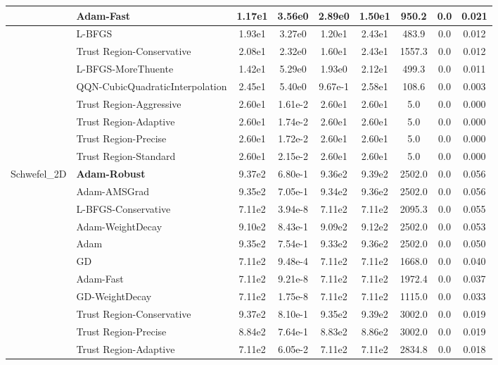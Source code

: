 \documentclass{article}
\begin{document}
\begin{longtable}{|l|l|c|c|c|c|c|c|c|}
\hline
 & Adam-Fast & 1.17e1 & 3.56e0 & 2.89e0 & 1.50e1 & 950.2 & 0.0 & 0.021 \\
\hline
 & L-BFGS & 1.93e1 & 3.27e0 & 1.20e1 & 2.43e1 & 483.9 & 0.0 & 0.012 \\
\hline
 & Trust Region-Conservative & 2.08e1 & 2.32e0 & 1.60e1 & 2.43e1 & 1557.3 & 0.0 & 0.012 \\
\hline
 & L-BFGS-MoreThuente & 1.42e1 & 5.29e0 & 1.93e0 & 2.12e1 & 499.3 & 0.0 & 0.011 \\
\hline
 & QQN-CubicQuadraticInterpolation & 2.45e1 & 5.40e0 & 9.67e-1 & 2.58e1 & 108.6 & 0.0 & 0.003 \\
\hline
 & Trust Region-Aggressive & 2.60e1 & 1.61e-2 & 2.60e1 & 2.60e1 & 5.0 & 0.0 & 0.000 \\
\hline
 & Trust Region-Adaptive & 2.60e1 & 1.74e-2 & 2.60e1 & 2.60e1 & 5.0 & 0.0 & 0.000 \\
\hline
 & Trust Region-Precise & 2.60e1 & 1.72e-2 & 2.60e1 & 2.60e1 & 5.0 & 0.0 & 0.000 \\
\hline
 & Trust Region-Standard & 2.60e1 & 2.15e-2 & 2.60e1 & 2.60e1 & 5.0 & 0.0 & 0.000 \\
Schwefel\_2D & \textbf{Adam-Robust} & 9.37e2 & 6.80e-1 & 9.36e2 & 9.39e2 & 2502.0 & 0.0 & 0.056 \\
\hline
 & Adam-AMSGrad & 9.35e2 & 7.05e-1 & 9.34e2 & 9.36e2 & 2502.0 & 0.0 & 0.056 \\
\hline
 & L-BFGS-Conservative & 7.11e2 & 3.94e-8 & 7.11e2 & 7.11e2 & 2095.3 & 0.0 & 0.055 \\
\hline
 & Adam-WeightDecay & 9.10e2 & 8.43e-1 & 9.09e2 & 9.12e2 & 2502.0 & 0.0 & 0.053 \\
\hline
 & Adam & 9.35e2 & 7.54e-1 & 9.33e2 & 9.36e2 & 2502.0 & 0.0 & 0.050 \\
\hline
 & GD & 7.11e2 & 9.48e-4 & 7.11e2 & 7.11e2 & 1668.0 & 0.0 & 0.040 \\
\hline
 & Adam-Fast & 7.11e2 & 9.21e-8 & 7.11e2 & 7.11e2 & 1972.4 & 0.0 & 0.037 \\
\hline
 & GD-WeightDecay & 7.11e2 & 1.75e-8 & 7.11e2 & 7.11e2 & 1115.0 & 0.0 & 0.033 \\
\hline
 & Trust Region-Conservative & 9.37e2 & 8.10e-1 & 9.35e2 & 9.39e2 & 3002.0 & 0.0 & 0.019 \\
\hline
 & Trust Region-Precise & 8.84e2 & 7.64e-1 & 8.83e2 & 8.86e2 & 3002.0 & 0.0 & 0.019 \\
\hline
 & Trust Region-Adaptive & 7.11e2 & 6.05e-2 & 7.11e2 & 7.11e2 & 2834.8 & 0.0 & 0.018 \\

\end{longtable}
\end{document}
